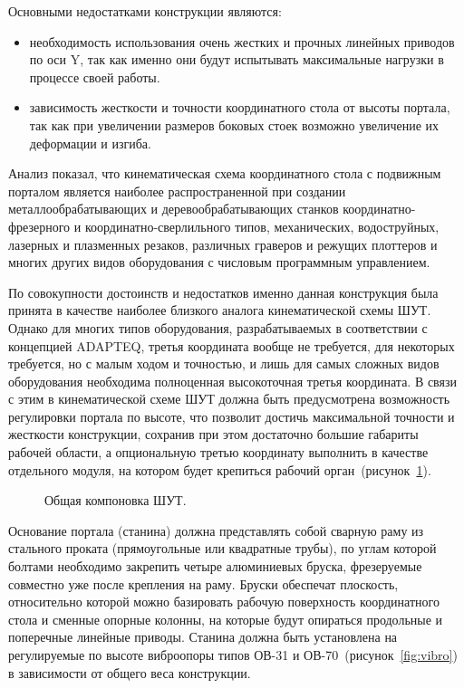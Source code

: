 Основными недостатками конструкции являются:

\begin{itemize}
	\item необходимость использования очень жестких и прочных линейных приводов по оси Y, так как именно они будут испытывать максимальные нагрузки в процессе своей работы.
	
	\item зависимость жесткости и точности координатного стола от высоты портала, так как при увеличении размеров боковых стоек возможно увеличение их деформации и изгиба.
\end{itemize}

Анализ показал, что кинематическая схема координатного стола с подвижным порталом является наиболее распространенной при создании металлообрабатывающих и деревообрабатывающих станков координатно-фрезерного и координатно-сверлильного типов, механических, водоструйных, лазерных и плазменных резаков, различных граверов и режущих плоттеров и многих других видов оборудования с числовым программным управлением.

По совокупности достоинств и недостатков именно данная конструкция была принята в качестве наиболее близкого аналога кинематической схемы ШУТ. Однако для многих типов оборудования, разрабатываемых в соответствии с концепцией ADAPTEQ, третья координата вообще не требуется, для некоторых требуется, но с малым ходом и точностью, и лишь для самых сложных видов оборудования необходима полноценная высокоточная третья координата. В связи с этим в кинематической схеме ШУТ должна быть предусмотрена возможность регулировки портала по высоте, что позволит достичь максимальной точности и жесткости конструкции, сохранив при этом достаточно большие габариты рабочей области, а опциональную третью координату выполнить в качестве отдельного модуля, на котором будет крепиться рабочий орган~(рисунок~\cref{fig:coord-chassis}).

\begin{figure}[ht]
	\caption{Общая компоновка ШУТ.}\label{fig:coord-chassis}
\end{figure}

Основание портала (станина) должна представлять собой сварную раму из стального проката (прямоугольные или квадратные трубы), по углам которой болтами необходимо закрепить четыре алюминиевых бруска, фрезеруемые совместно уже после крепления на раму. Бруски обеспечат плоскость, относительно которой можно базировать рабочую поверхность координатного стола и сменные опорные колонны, на которые будут опираться продольные и поперечные линейные приводы. Станина должна быть установлена на регулируемые по высоте виброопоры типов ОВ-31 и ОВ-70~(рисунок~\cref{fig:vibro}) в зависимости от общего веса конструкции.

